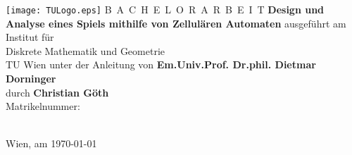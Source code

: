 

\begin{titlepage}
  \begin{center}
    \texttt{[image: TULogo.eps]}
    \vskip 1cm%
    {\LARGE B~\Large A~C~H~E~L~O~R~A~R~B~E~I~T}
    \vskip 8mm
    {\huge\bfseries\color{change} Design und Analyse eines Spiels mithilfe von Zellulären Automaten}
    \vskip 1cm
    \large
    ausgef\"uhrt am
    \vskip 0.75cm
    {\Large Institut f\"ur\\[1ex] Diskrete Mathematik und Geometrie}\\[1ex]
    {\Large TU Wien}
    \vskip0.75cm
    unter der Anleitung von
    \vskip0.75cm
    {\Large\bfseries\color{change} Em.Univ.Prof. Dr.phil. Dietmar Dorninger}\\[1ex]
    \vskip 0.5cm
    durch
    \vskip 0.5cm
    {\Large\bfseries \color{change}Christian Göth}\\[1ex]
    Matrikelnummer: \color{change}{11811883}\\[1ex]
    \color{change}{Kaiserin Elisabethstraße 14}\\[1ex]
    \color{change}{2340 Mödling}
  \end{center}

  \vfill

  \small
  Wien, am \color{change}\today
  \vspace*{-15mm}
\end{titlepage}

\cleardoublepage
